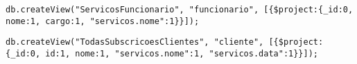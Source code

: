 \begin{lstlisting}[caption=Listar os serviço que cada funcionário faz]
    db.createView("ServicosFuncionario", "funcionario", [{$project:{_id:0, nome:1, cargo:1, "servicos.nome":1}}]);
\end{lstlisting}

\begin{lstlisting}[caption=Listar a que serviços os clientes estão subscritos]
    db.createView("TodasSubscricoesClientes", "cliente", [{$project:{_id:0, id:1, nome:1, "servicos.nome":1, "servicos.data":1}}]);
\end{lstlisting}
